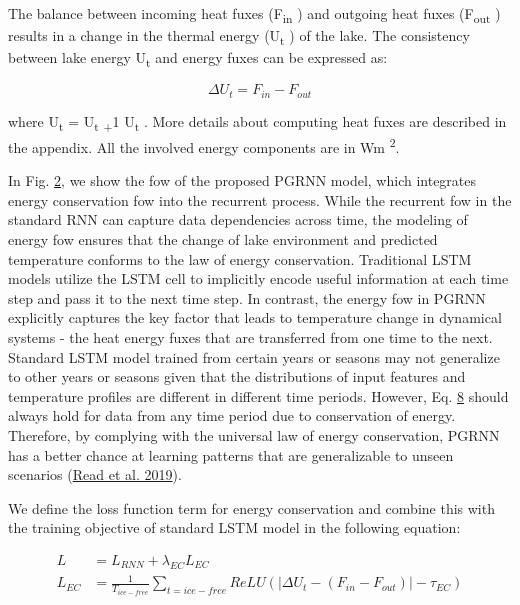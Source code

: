 \documentclass[book.tex]{subfiles}
\begin{document}
The balance between incoming heat fuxes (F\textsubscript{in} ) and
outgoing heat fuxes (F\textsubscript{out} ) results in a change in the
thermal energy (U\textsubscript{t} ) of the lake. The consistency between
lake energy U\textsubscript{t} and energy fuxes can be expressed as:


\begin{equation}
    \Delta U_t = F_{in} - F_{out}
\end{equation}


where U\textsubscript{t} = U\textsubscript{t} \textsubscript{+}1
U\textsubscript{t} . More details about computing heat fuxes are
described in the appendix. All the involved energy components are in Wm
\textsuperscript{2}.

In Fig. \protect\hyperlink{page8}{2}, we show the fow of the proposed
PGRNN model, which integrates energy conservation fow into the recurrent
process. While the recurrent fow in the standard RNN can capture data
dependencies across time, the modeling of energy fow ensures that the
change of lake environment and predicted temperature conforms to the law
of energy conservation. Traditional LSTM models utilize the LSTM cell to
implicitly encode useful information at each time step and pass it to
the next time step. In contrast, the energy fow in PGRNN explicitly
captures the key factor that leads to temperature change in dynamical
systems - the heat energy fuxes that are transferred from one time to
the next. Standard LSTM model trained from certain years or seasons may
not generalize to other years or seasons given that the distributions of
input features and temperature profiles are different in different
time periods. However, Eq. \protect\hyperlink{page8}{8} should always
hold for data from any time period due to conservation of energy.
Therefore, by complying with the universal law of energy conservation,
PGRNN has a better chance at learning patterns that are generalizable to
unseen scenarios (\protect\hyperlink{page24}{Read et al. 2019}).





We define the loss function term for energy conservation and
combine this with the training objective of standard
LSTM model in the following equation:

\begin{align}
L &= L_{RNN} + \lambda_{EC}L_{EC}\\
L_{EC} &= \frac{1}{T_{ice-free}}\sum_{t=ice-free}ReLU(|\Delta U_t -(F_{in}-F_{out})|-\tau_{EC})
\end{align}
\end{document}
